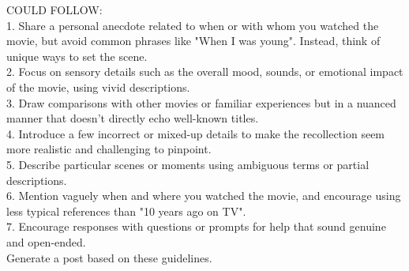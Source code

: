 \begin{tcolorbox}
COULD FOLLOW:\\
1. Share a personal anecdote related to when or with whom you watched the movie, but avoid common phrases like "When I was young". Instead, think of unique ways to set the scene.\\
2. Focus on sensory details such as the overall mood, sounds, or emotional impact of the movie, using vivid descriptions.\\
3. Draw comparisons with other movies or familiar experiences but in a nuanced manner that doesn't directly echo well-known titles.\\
4. Introduce a few incorrect or mixed-up details to make the recollection seem more realistic and challenging to pinpoint.\\
5. Describe particular scenes or moments using ambiguous terms or partial descriptions.\\
6. Mention vaguely when and where you watched the movie, and encourage using less typical references than "10 years ago on TV".\\
7. Encourage responses with questions or prompts for help that sound genuine and open-ended.\\


Generate a post based on these guidelines.
\end{tcolorbox}


\newpage
